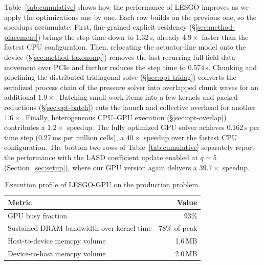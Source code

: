 Table~\ref{tab:cumulative} shows how the performance of LESGO improves as we apply the optimizations one by one. Each row
builds on the previous one, so the speedups accumulate. 
First, fine-grained
explicit residency (\S\ref{sec:method-placement}) brings the step time
down to 1.32\,s, already $4.9\times$ faster than the fastest CPU
configuration.
Then, relocating the actuator-line model onto the device
(\S\ref{sec:method-taxonomy}) removes the last recurring full-field
data movement over PCIe and further reduces the step time to
0.574\,s. Chunking and pipelining the
distributed tridiagonal solve (\S\ref{sec:opt-tridag}) converts the
serialized process chain of the pressure solver into overlapped chunk
waves for an additional $1.9\times$. Batching small work items into a few
kernels and packed reductions (\S\ref{sec:opt-batch}) cuts the
launch and collective overhead for another $1.6\times$. Finally,
heterogeneous CPU--GPU execution
(\S\ref{sec:opt-overlap}) contributes a $1.2\times$ speedup.
The fully optimized GPU solver achieves 0.162\,s per time step (0.27\,ms
per million cells), a $40\times$ speedup over the fastest
CPU configuration. 
The bottom two rows of Table~\ref{tab:cumulative} separately report
the performance with the LASD coefficient update enabled at $q=5$
(Section~\ref{sec:setup}), where our GPU version again delivers a
$39.7\times$ speedup.


\begin{table}[h]
    \vspace{-0.05in}
    \centering
    \caption{Execution profile of LESGO-GPU on the production problem.
    }
    \label{tab:finalmetrics}
    \footnotesize
    \begin{tabular}{@{}lr@{}}
    \toprule
    Metric & Value \\
    \midrule
    GPU busy fraction & 93\% \\
    Sustained DRAM bandwidth over kernel time & 78\% of peak \\
    Host-to-device memcpy volume & 1.6\,MB \\
    Device-to-host memcpy volume & 2.0\,MB \\
    \bottomrule
    \end{tabular}
\end{table}


